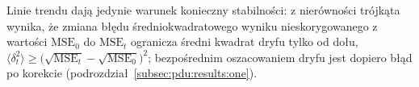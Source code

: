 Linie trendu dają jedynie warunek konieczny stabilności: z nierówności trójkąta wynika, że zmiana błędu średniokwadratowego wyniku nieskorygowanego z wartości $\mathrm{MSE}_0$ do $\mathrm{MSE}_t$ ogranicza średni kwadrat dryfu tylko od dołu, $\langle\delta_t^2\rangle\ge\bigl(\sqrt{\mathrm{MSE}_t}-\sqrt{\mathrm{MSE}_0}\bigr)^2$; bezpośrednim oszacowaniem dryfu jest dopiero błąd po korekcie (podrozdział~\ref{subsec:pdu:results:one}).

